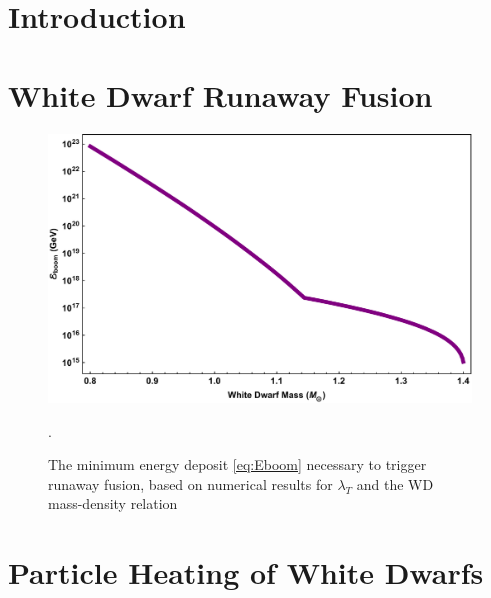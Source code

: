 \documentclass[preprintnumbers,amsmath,amssymb,prd,superscriptaddress]{revtex4}
\begin{document}
\section{Introduction}
\label{sec:intro}


\section{White Dwarf Runaway Fusion}
\label{sec:boomreview}


\begin{figure}
\includegraphics[scale=.3]{Eboom.pdf}
\caption{The minimum energy deposit \eqref{eq:Eboom} necessary to trigger runaway fusion, based on numerical results for $\lambda_T$ \cite{Woosley} and the WD mass-density relation \cite{cococubed}}.
\label{fig:Eboom}
\end{figure}

\section{Particle Heating of White Dwarfs}
\label{sec:smheating}
\end{document}
